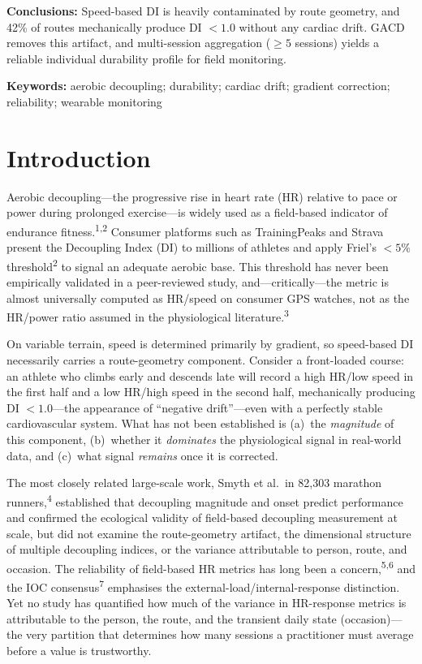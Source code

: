 \documentclass[12pt]{article}
\begin{document}
\noindent\textbf{Conclusions:} Speed-based DI is heavily contaminated by
route geometry, and 42\% of routes mechanically produce DI $< 1.0$
without any cardiac drift. GACD removes this artifact, and multi-session
aggregation ($\geq 5$ sessions) yields a reliable individual durability
profile for field monitoring.

\vspace{1em}
\noindent\textbf{Keywords:} aerobic decoupling; durability; cardiac
drift; gradient correction; reliability; wearable monitoring

\clearpage

\section{Introduction}
Aerobic decoupling---the progressive rise in heart rate (HR) relative to
pace or power during prolonged exercise---is widely used as a field-based
indicator of endurance fitness.\textsuperscript{1,2} Consumer platforms
such as TrainingPeaks and Strava present the Decoupling Index (DI) to
millions of athletes and apply Friel's $<5\%$ threshold\textsuperscript{2}
to signal an adequate aerobic base. This threshold has never been
empirically validated in a peer-reviewed study, and---critically---the
metric is almost universally computed as HR/speed on consumer GPS
watches, not as the HR/power ratio assumed in the physiological
literature.\textsuperscript{3}

On variable terrain, speed is determined primarily by gradient, so
speed-based DI necessarily carries a route-geometry component. Consider a
front-loaded course: an athlete who climbs early and descends late will
record a high HR/low speed in the first half and a low HR/high speed in
the second half, mechanically producing DI $< 1.0$---the appearance of
``negative drift''---even with a perfectly stable cardiovascular system.
What has not been established is (a)~the \emph{magnitude} of this
component, (b)~whether it \emph{dominates} the physiological signal in
real-world data, and (c)~what signal \emph{remains} once it is corrected.

The most closely related large-scale work, Smyth et al.\ in 82,303
marathon runners,\textsuperscript{4} established that decoupling magnitude
and onset predict performance and confirmed the ecological validity of
field-based decoupling measurement at scale, but did not examine the
route-geometry artifact, the dimensional structure of multiple decoupling
indices, or the variance attributable to person, route, and occasion. The
reliability of field-based HR metrics has long been a
concern,\textsuperscript{5,6} and the IOC consensus\textsuperscript{7}
emphasises the external-load/internal-response distinction. Yet no study
has quantified how much of the variance in HR-response metrics is
attributable to the person, the route, and the transient daily state
(occasion)---the very partition that determines how many sessions a
practitioner must average before a value is trustworthy.
\end{document}
